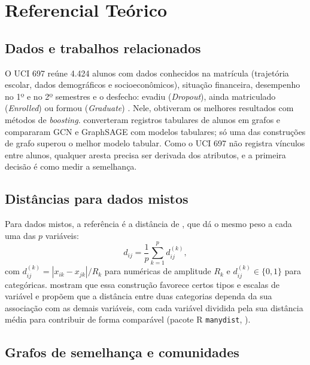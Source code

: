 \section{Referencial Teórico}
\label{referencial}

\subsection{Dados e trabalhos relacionados}

O UCI 697 reúne 4.424 alunos com dados conhecidos na matrícula (trajetória escolar, dados demográficos e socioeconômicos), situação financeira, desempenho no 1º e no 2º semestres e o desfecho: evadiu (\textit{Dropout}), ainda matriculado (\textit{Enrolled}) ou formou (\textit{Graduate}) \citep{realinho2022}. Nele, \cite{villar2024} obtiveram os melhores resultados com métodos de \textit{boosting}. \cite{almeida2025} converteram registros tabulares de alunos em grafos e compararam GCN e GraphSAGE com modelos tabulares; só uma das construções de grafo superou o melhor modelo tabular. Como o UCI 697 não registra vínculos entre alunos, qualquer aresta precisa ser derivada dos atributos, e a primeira decisão é como medir a semelhança.

\subsection{Distâncias para dados mistos}

Para dados mistos, a referência é a distância de \cite{gower1971}, que dá o mesmo peso a cada uma das $p$ variáveis:
\begin{equation}
d_{ij} = \frac{1}{p}\sum_{k=1}^{p} d_{ij}^{(k)},
\label{eq-gower}
\end{equation}
com $d_{ij}^{(k)} = |x_{ik} - x_{jk}| / R_k$ para numéricas de amplitude $R_k$ e $d_{ij}^{(k)} \in \{0,1\}$ para categóricas. \cite{vandevelden2026} mostram que essa construção favorece certos tipos e escalas de variável e propõem que a distância entre duas categorias dependa da sua associação com as demais variáveis, com cada variável dividida pela sua distância média para contribuir de forma comparável (pacote R \texttt{manydist}, \citealp{manydist}).

\subsection{Grafos de semelhança e comunidades}

